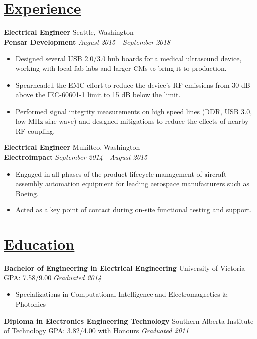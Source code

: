 \documentclass[a4paper, 11pt]{article}
\begin{document}
\section{\underline{Experience}}
  \textbf{Electrical Engineer}
  \hfill
  Seattle, Washington \\
  \textbf{Pensar Development}
  \hfill
  \emph{August 2015 - September 2018}
  \begin{itemize}[nosep]
    \item Designed several USB 2.0/3.0 hub boards for a medical ultrasound device, working with local fab labs and larger CMs to bring it to production.
    \item Spearheaded the EMC effort to reduce the device's RF emissions from 30 dB above the IEC-60601-1 limit to 15 dB below the limit.
    \item Performed signal integrity measurements on high speed lines (DDR, USB 3.0, low MHz sine wave) and designed mitigations to reduce the effects of nearby RF coupling.
  \end{itemize}
  \bigskip
  
  \textbf{Electrical Engineer}
  \hfill
  Mukilteo, Washington \\
  \textbf{Electroimpact}
  \hfill
  \emph{September 2014 - August 2015}
  \begin{itemize}[nosep]
    \item Engaged in all phases of the product lifecycle management of aircraft assembly automation equipment for leading aerospace manufacturers such as Boeing.
    \item Acted as a key point of contact during on-site functional testing and support.
  \end{itemize}

\section{\underline{Education}}
  \textbf{Bachelor of Engineering in Electrical Engineering}
  \hfill
  University of Victoria\\
  GPA: 7.58/9.00
  \hfill
  \emph{Graduated 2014}
  \begin{itemize}[nosep]
    \item Specializations in Computational Intelligence and Electromagnetics \& Photonics
  \end{itemize}
  \bigskip
  
  \textbf{Diploma in Electronics Engineering Technology}
  \hfill
  Southern Alberta Institute of Technology
  GPA: 3.82/4.00 with Honours
  \hfill
  \emph{Graduated 2011}
  
\end{document}
